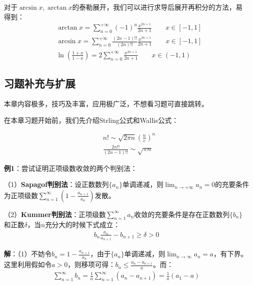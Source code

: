 \documentclass{ctexart}
\let\oldtextbf\textbf
\renewcommand{\textbf}[1]{\textcolor{brown!50!red}{\oldtextbf{#1}}}
\begin{document}
对于$\arcsin x,\arctan x$的泰勒展开，我们可以进行\colorbox{pink!30!white}求导后展开再积分的方法，易得到：
\begin{align*}
   &\arctan x=\sum_{n=0}^{+\infty}(-1)^n\frac{x^{2n+1}}{2n+1}\qquad x\in[-1,1]\tag{5-7}\\
 &\arcsin x=\sum_{n=0}^{+\infty}\frac{(2n-1)!!}{(2n)!!}\frac{x^{2n+1}}{2n+1}\qquad x\in[-1,1]\tag{5-8}\\
 &\ln(\frac{1+x}{1-x})=2\sum_{n=0}^{+\infty}\frac{x^{2n+1}}{2n+1}\qquad x\in(-1,1)\tag{5-9}
\end{align*}

\subsection{习题补充与扩展}
本章内容极多，技巧及丰富，应用极广泛，不想看习题可直接跳转。

在本章习题开始前，我们先介绍Strling公式和Wallis公式：
\begin{tcolorbox}[
    colback=bac1,     %
    colframe=fra1,   %
    coltitle=white!80,    
    coltext=tex1,%
    title=Strling公式与Wallis公式,
    fonttitle=\bfseries,        %
    arc=2mm,                    %
    breakable
]
\begin{align*}
    &n!\sim \sqrt{2\pi n}(\frac{n}{e})^n\\
    &\frac{2n!!}{(2n-1)!!}\sim\sqrt{\pi n}
\end{align*}
\end{tcolorbox}

\textbf{\color{brown!50!red}例1}：尝试证明正项级数收敛的两个判别法：

（1）\textbf{\color{brown!50!red}Sapagof判别法}：设正数数列$\{a_n\}$单调递减，则$\lim_{n\to+\infty} a_n=0$的充要条件为正项级数$\sum_{n=1}^\infty (1-\frac{a_{n+1}}{a_n})$发散。

（2）\textbf{\color{brown!50!red}Kummer判别法}：正项级数$\sum_{n=1}^\infty a_n$收敛的充要条件是存在正数数列$\{b_n\}$和正数$\delta$，当$n$充分大的时候下式成立：
\begin{align*}
    b_n\frac{a_n}{a_{n+1}}-b_{n+1}\geq\delta>0
\end{align*}

\textbf{\color{brown!50!red}解}：（1）不妨令$b_n=1-\frac{a_{n+1}}{a_n}$，由于$\{a_n\}$单调递减，则$\lim_{n\to\infty}a_n=a$，有下界。这里利用假如令$a> 0$，则移项可得：$b_n\leq \frac{a_n-a_{n+1}}{a}$。而：
\begin{align*}
    \sum_{n=1}^\infty b_n=\frac{1}{a}\sum_{n=1}^\infty(a_n-a_{n+1})=\frac{1}{a}(a_1-a)
\end{align*}
\end{document}
